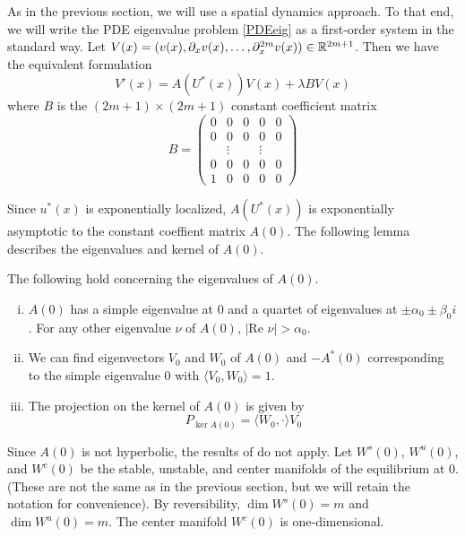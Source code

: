 \documentclass[thesis.tex]{subfiles}
\begin{document}
As in the previous section, we will use a spatial dynamics approach. To that end, we will write the PDE eigenvalue problem \eqref{PDEeig} as a first-order system in the standard way. Let $V(x) = (v(x), \partial_x v(x), \dots, \partial_x^{2m}v(x)) \in {\mathbb R}^{2m+1}$. Then we have the equivalent formulation
\begin{equation}\label{PDEeig2}
V'(x) = A(U^*(x))V(x) + \lambda B V(x)
\end{equation}
where $B$ is the $(2m+1) \times (2m+1)$ constant coefficient matrix
\begin{equation}\label{DefB}
B = \begin{pmatrix}0 & 0 & 0 & 0 & 0 \\0 & 0 & 0 & 0 & 0 \\  & 
\vdots & & \vdots & \\0 & 0 & 0 & 0 & 0 \\1 & 0 & 0 & 0 & 0 \end{pmatrix} 
\end{equation}

Since $u^*(x)$ is exponentially localized, $A(U^*(x))$ is exponentially asymptotic to the constant coeffient matrix $A(0)$. The following lemma describes the eigenvalues and kernel of $A(0)$.

\begin{lemma}\label{eigA0lemma}
The following hold concerning the eigenvalues of $A(0)$.
\begin{enumerate}[(i)]
\item $A(0)$ has a simple eigenvalue at 0 and a quartet of eigenvalues at $\pm \alpha_0 \pm \beta_0 i$. For any other eigenvalue $\nu$ of $A(0)$, $|\text{Re }\nu| > \alpha_0$.
\item We can find eigenvectors $V_0$ and $W_0$ of $A(0)$ and $-A^*(0)$ corresponding to the simple eigenvalue 0 with $\langle V_0, W_0 \rangle = 1$.
\item The projection on the kernel of $A(0)$ is given by
\begin{equation}\label{projkernelA0}
P_{\ker A(0)} = \langle W_0, \cdot \rangle V_0
\end{equation}
\end{enumerate} 
\end{lemma}

Since $A(0)$ is not hyperbolic, the results of \cite{Sandstede1998} do not apply. Let $W^s(0)$, $W^u(0)$, and $W^c(0)$ be the stable, unstable, and center manifolds of the equilibrium at 0. (These are not the same as in the previous section, but we will retain the notation for convenience). By reversibility, $\dim W^s(0) = m$ and $\dim W^u(0) = m$. The center manifold $W^c(0)$ is one-dimensional.
\end{document}
